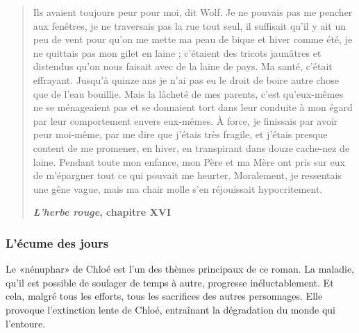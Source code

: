 {\small
\begin{quotation}
Ils avaient toujours peur pour moi, dit Wolf. Je ne pou­vais pas me pencher aux fenêtres,
je ne traversais pas la rue tout seul, il suffi­sait qu'il y ait un peu de vent pour qu'on
me mette ma peau de bique et hiver comme été, je ne quittais pas mon gilet en laine ;
c’étaient des tricots jaunâtres et distendus qu’on nous faisait avec de la laine de pays.
Ma santé, c’était effrayant. Jus­qu’à quinze ans je n’ai pas eu le droit de boire autre chose
que de l’eau bouillie. Mais la lâcheté de mes parents, c’est qu’eux-mêmes ne se ménageaient
pas et se donnaient tort dans leur conduite à mon égard par leur comportement envers eux-mêmes.
À force, je finis­sais par avoir peur moi-même, par me dire que j’étais très fragile, et j’étais
presque content de me promener, en hiver, en transpirant dans douze cache-nez de laine. Pendant
toute mon enfance, mon Père et ma Mère ont pris sur eux de m’épargner tout ce qui pouvait me
heurter. Mo­ra­le­ment, je ressentais une gêne vague, mais ma chair molle s’en ré­jouis­sait
hypocritement.

{\bf \emph{L'herbe rouge}, chapitre XVI}
\end{quotation}
}


\subsubsection{L'écume des jours}
Le «nénuphar» de Chloé est l'un des thèmes principaux
de ce roman. La maladie, qu'il est possible de soulager de temps à autre,
progresse inéluctablement. Et cela, malgré tous les efforts, tous les
sacrifices des autres personnages. Elle provoque l'extinction lente
de Chloé, entraînant la dégradation du monde qui l'entoure.


